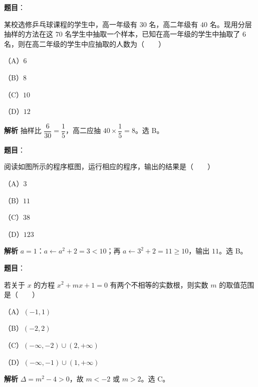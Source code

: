 \begin{answer}

\textbf{题目}：

某校选修乒乓球课程的学生中，高一年级有 $30$ 名，高二年级有 $40$ 名。现用分层抽样的方法在这 $70$ 名学生中抽取一个样本，已知在高一年级的学生中抽取了 $6$ 名，则在高二年级的学生中应抽取的人数为\mbox{（　　）}

（A）$6$

（B）$8$

（C）$10$

（D）$12$

\textbf{解析}
抽样比 $\dfrac6{30}=\dfrac15$，高二应抽 $40\times\dfrac15=8$。选 B。


\end{answer}
\begin{answer}

\textbf{题目}：

阅读如图所示的程序框图，运行相应的程序，输出的结果是\mbox{（　　）}

（A）$3$

（B）$11$

（C）$38$

（D）$123$
\nopagebreak[4]
\begin{center}\end{center}
\nopagebreak[4]
\textbf{解析}
$a=1$：$a\leftarrow a^2+2=3<10$；再 $a\leftarrow3^2+2=11\ge10$，输出 $11$。选 B。


\end{answer}
\begin{answer}

\textbf{题目}：

若关于 $x$ 的方程 $x^2+mx+1=0$ 有两个不相等的实数根，则实数 $m$ 的取值范围是\mbox{（　　）}

（A）$(-1,1)$

（B）$(-2,2)$

（C）$(-\infty,-2)\cup(2,+\infty)$

（D）$(-\infty,-1)\cup(1,+\infty)$

\textbf{解析}
$\Delta=m^2-4>0$，故 $m<-2$ 或 $m>2$。选 C。


\end{answer}
